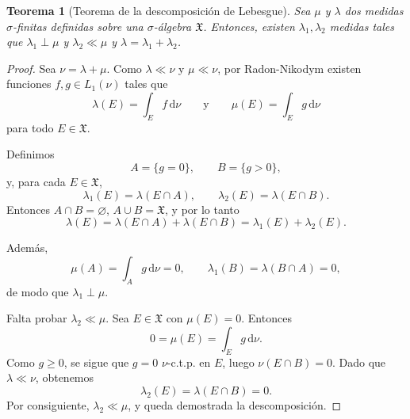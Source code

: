 \documentclass[12pt,a4paper]{article}
\theoremstyle{profesional}
\newtheorem{teorema}{Teorema}[section]
\theoremstyle{definicion-style}
\newcommand{\X}{\mathfrak{X}}
\begin{document}
\begin{teorema}[Teorema de la descomposición de Lebesgue]
    Sea \( \mu \) y \( \lambda \) dos medidas \( \sigma \)-finitas definidas sobre una \( \sigma \)-álgebra \( \X \). Entonces, existen \( \lambda_1, \lambda_2 \) medidas tales que \( \lambda_1 \perp \mu \) y
    \( \lambda_2 \ll \mu \) y \( \lambda = \lambda_1 + \lambda_2 \).
\end{teorema}
\begin{proof}
    Sea \( \nu = \lambda + \mu \). Como \( \lambda \ll \nu \) y \( \mu \ll \nu \), por Radon-Nikodym existen funciones \( f,g \in L_1(\nu) \) tales que
    \[
        \lambda(E)=\int_E f\,\mathrm d\nu
        \qquad\text{y}\qquad
        \mu(E)=\int_E g\,\mathrm d\nu
    \]
    para todo \( E\in\X \).

    Definimos
    \[
        A=\{g=0\}, \qquad B=\{g>0\},
    \]
    y, para cada \( E\in\X \),
    \[
        \lambda_1(E)=\lambda(E\cap A),
        \qquad
        \lambda_2(E)=\lambda(E\cap B).
    \]
    Entonces \( A\cap B=\varnothing \), \( A\cup B=\X \), y por lo tanto
    \[
        \lambda(E)=\lambda(E\cap A)+\lambda(E\cap B)=\lambda_1(E)+\lambda_2(E).
    \]

    Además,
    \[
        \mu(A)=\int_A g\,\mathrm d\nu=0,
        \qquad
        \lambda_1(B)=\lambda(B\cap A)=0,
    \]
    de modo que \( \lambda_1\perp\mu \).

    Falta probar \( \lambda_2\ll\mu \). Sea \( E\in\X \) con \( \mu(E)=0 \). Entonces
    \[
        0=\mu(E)=\int_E g\,\mathrm d\nu.
    \]
    Como \( g\ge 0 \), se sigue que \( g=0 \) \( \nu \)-c.t.p. en \( E \), luego \( \nu(E\cap B)=0 \). Dado que \( \lambda\ll\nu \), obtenemos
    \[
        \lambda_2(E)=\lambda(E\cap B)=0.
    \]
    Por consiguiente, \( \lambda_2\ll\mu \), y queda demostrada la descomposición.
\end{proof}
\end{document}
